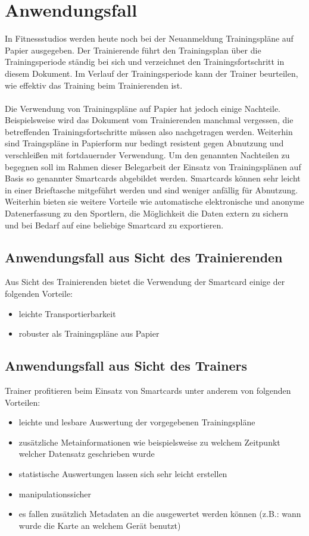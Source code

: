 \clearpage
\section{Anwendungsfall}
\label{sec:1}
In Fitnessstudios werden heute noch bei der Neuanmeldung Trainingspläne auf Papier ausgegeben. Der Trainierende führt den Trainingsplan über die Trainingsperiode ständig bei sich und verzeichnet den Trainingsfortschritt in diesem Dokument.
Im Verlauf der Trainingsperiode kann der Trainer beurteilen, wie effektiv das Training beim Trainierenden ist.\\
\\
Die Verwendung von Trainingspläne auf Papier hat jedoch einige Nachteile. Beispielsweise wird das Dokument vom Trainierenden manchmal vergessen, die betreffenden Trainingsfortschritte müssen also nachgetragen werden. 
Weiterhin sind Traingspläne in Papierform nur bedingt resistent gegen Abnutzung und verschleißen mit fortdauernder Verwendung.
Um den genannten Nachteilen zu begegnen soll im Rahmen dieser Belegarbeit der Einsatz von Trainingsplänen
auf Basis so genannter Smartcards abgebildet werden. Smartcards können sehr leicht in einer Brieftasche mitgeführt werden und sind weniger anfällig für Abnutzung.
Weiterhin bieten sie weitere Vorteile wie automatische elektronische und anonyme Datenerfassung zu den Sportlern, die Möglichkeit die Daten extern zu sichern und bei Bedarf auf eine beliebige Smartcard zu exportieren.

\subsection{Anwendungsfall aus Sicht des Trainierenden}
\label{subsec:1.1}

Aus Sicht des Trainierenden bietet die Verwendung der Smartcard einige der folgenden Vorteile:
\begin{itemize}
\item leichte Transportierbarkeit
\item robuster als Trainingspläne aus Papier
\end{itemize}


\subsection{Anwendungsfall aus Sicht des Trainers}
\label{subsec:1.2}
Trainer profitieren beim Einsatz von Smartcards unter anderem von folgenden Vorteilen:
\begin{itemize}
\item leichte und lesbare Auswertung der vorgegebenen Trainingspläne
\item zusätzliche Metainformationen wie beispielsweise zu welchem Zeitpunkt welcher Datensatz geschrieben wurde
\item statistische Auswertungen lassen sich sehr leicht erstellen 
\item manipulationssicher
\item es fallen zusätzlich Metadaten an die ausgewertet werden können (z.B.: wann wurde die Karte an welchem Gerät benutzt)
\end{itemize} 
